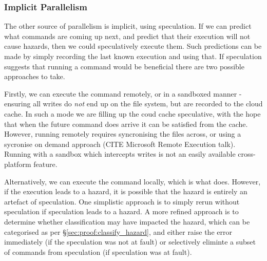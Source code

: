 \subsubsection{Implicit Parallelism}

The other source of parallelism is implicit, using speculation. If we can predict what commands are coming up next, and predict that their execution will not cause hazards, then we could speculatively execute them. Such predictions can be made by simply recording the last known execution and using that. If speculation suggests that running a command would be beneficial there are two possible approaches to take.

Firstly, we can execute the command remotely, or in a sandboxed manner - ensuring all writes do \emph{not} end up on the file system, but are recorded to the cloud cache. In such a mode we are filling up the coud cache speculative, with the hope that when the future command does arrive it can be satisfied from the cache. However, running remotely requires syncronising the files across, or using a sycronise on demand approach (CITE Microsoft Remote Execution talk). Running with a sandbox which intercepts writes is not an easily available cross-platform feature.

Alternatively, we can execute the command locally, which is what \Rattle does. However, if the execution leads to a hazard, it is possible that the hazard is entirely an artefact of speculation. One simplistic approach is to simply rerun without speculation if speculation leads to a hazard. A more refined approach is to determine whether classification may have impacted the hazard, which can be categorised as per \S\ref{sec:proof:classify_hazard}, and either raise the error immediately (if the speculation was not at fault) or selectively eliminte a subset of commands from speculation (if speculation was at fault).
